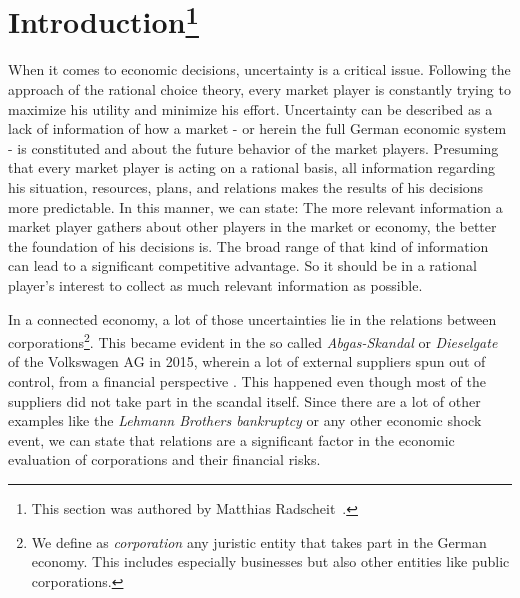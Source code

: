 \section*{Introduction\footnote{This section was authored by Matthias Radscheit\ \cite{loeperradscheit}.}}
\label{sec:Introduction}
When it comes to economic decisions, uncertainty is a critical issue. Following the approach of the rational choice theory, every market player is constantly trying to maximize his utility and minimize his effort. Uncertainty can be described as a lack of information of how a market - or herein the full German economic system - is constituted and about the future behavior of the market players. Presuming that every market player is acting on a rational basis, all information regarding his situation, resources, plans, and relations makes the results of his decisions more predictable. In this manner, we can state: The more relevant information a market player gathers about other players in the market or economy, the better the foundation of his decisions is. The broad range of that kind of information can lead to a significant competitive advantage. So it should be in a rational player's interest to collect as much relevant information as possible.\par
In a connected economy, a lot of those uncertainties lie in the relations between corporations\footnote{We define as \emph{corporation} any juristic entity that takes part in the German economy. This includes especially businesses but also other entities like public corporations.}. This became evident in the so called \emph{Abgas-Skandal} or \emph{Dieselgate} of the Volkswagen AG in 2015, wherein a lot of external suppliers spun out of control, from a financial perspective \cite{stuttzeit, automobilwoche}. This happened even though most of the suppliers did not take part in the scandal itself. Since there are a lot of other examples like the \emph{Lehmann Brothers bankruptcy} or any other economic shock event, we can state that relations are a significant factor in the economic evaluation of corporations and their financial risks.\par

